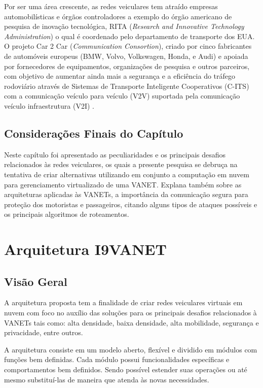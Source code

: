 \documentclass[
	12pt,				%
	oneside,			%
	a4paper,			%
	english,			%
	brazil				%
	]{abntex2ppgsi}
\begin{document}
Por ser uma área crescente, as redes veiculares tem atraído empresas automobilísticas e órgãos controladores  a exemplo do órgão americano de pesquisa de inovação tecnológica, RITA (\textit{Research and Innovative Technology Administration}) o qual é coordenado pelo departamento de transporte dos EUA. O projeto Car 2 Car (\textit{Communication Consortion}), criado por cinco fabricantes de automóveis europeus (BMW, Volvo, Volkswagen, Honda, e Audi) e apoiada por fornecedores de equipamentos, organizações de pesquisa e outros parceiros, com objetivo de aumentar ainda mais a segurança e a eficiência do tráfego rodoviário através de Sistemas de Transporte Inteligente Cooperativos (C-ITS) com a comunicação veículo para veículo (V2V) suportada pela comunicação veículo infraestrutura (V2I) . 

\section{Considerações Finais do Capítulo}
Neste capítulo foi apresentado as peculiaridades e os principais desafios relacionados às redes veiculares, os quais a presente pesquisa se debruça na tentativa de criar alternativas utilizando em conjunto a computação em nuvem para gerenciamento virtualizado de uma VANET. Explana também sobre as arquiteturas aplicadas às VANETs, a importância da comunicação segura para proteção dos motoristas e passageiros, citando alguns tipos de ataques possíveis e os principais algoritmos de roteamentos.

\chapter{Arquitetura I9VANET}\label{sec:i9vanet}

\section{Visão Geral}
A arquitetura proposta tem a finalidade de criar redes veiculares virtuais em nuvem com foco no auxílio das soluções para os principais desafios relacionados à VANETs tais como: alta densidade, baixa densidade, alta mobilidade, segurança e privacidade, entre outros. 

A arquitetura consiste em um modelo aberto, flexível e dividido em módulos com funções bem definidas. Cada módulo possui funcionalidades específicas e comportamentos bem definidos. Sendo possível estender suas operações ou até mesmo substituí-las de maneira que atenda às novas necessidades.
\end{document}
